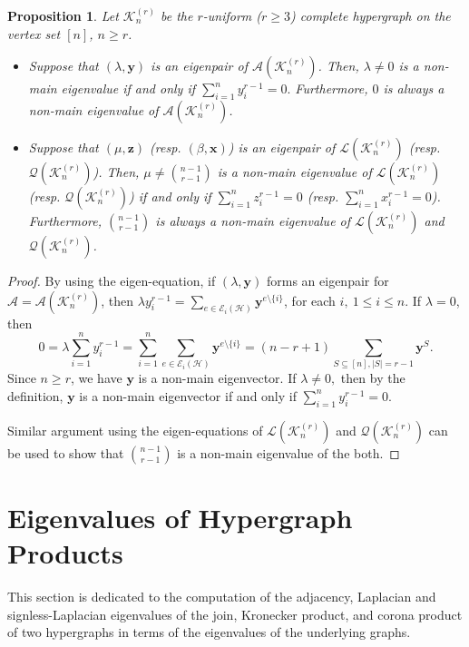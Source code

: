 \documentclass[10pt,a4paper]{article}
\newtheorem{proposition}{Proposition}[section]
\begin{document}
	\begin{proposition}
		Let $\mathcal{K}_n^{(r)}$ be the $r$-uniform ($r \geq 3$) complete hypergraph on the vertex set $[n]$, $n \geq r$.
		\begin{itemize}
			\item Suppose that  $(\lambda, \mathbf{y})$ is an eigenpair of $\mathcal{A}(\mathcal{K}_n^{(r)})$. Then, $\lambda \neq 0$ is a non-main eigenvalue if and only if $\sum_{i=1}^n y_i^{r-1}=0.$ 
			Furthermore,      $0$ is always a non-main eigenvalue of $\mathcal{A}(\mathcal{K}_n^{(r)})$.
			\item Suppose that  $(\mu, \mathbf{z})$ (resp. $(\beta, \mathbf{x})$) is an eigenpair of $\mathcal{L}(\mathcal{K}_n^{(r)})$ (resp. $\mathcal{Q}(\mathcal{K}_n^{(r)})$). Then, $\mu \neq \binom{n-1}{r-1}$ is a non-main eigenvalue of $\mathcal{L}(\mathcal{K}_n^{(r)})$ (resp. $\mathcal{Q}(\mathcal{K}_n^{(r)})$) if and only if $\sum_{i=1}^n z_i^{r-1}=0$ (resp. $\sum_{i=1}^n x_i^{r-1}=0$). 
			Furthermore, $\binom{n-1}{r-1}$ is always a non-main eigenvalue of $\mathcal{L}(\mathcal{K}_n^{(r)})$ and $\mathcal{Q}(\mathcal{K}_n^{(r)})$. 
		\end{itemize}
	\end{proposition}
	\begin{proof}
		By using the eigen-equation, if $(\lambda, \mathbf{y})$ forms an eigenpair for $\mathcal{A}=\mathcal{A}(\mathcal{K}_n^{(r)})$, then $\lambda y_i^{r-1} = \sum_{e \in \mathcal{E}_i(\mathcal{H})} \mathbf{y}^{e \setminus \{i\}}$, for each $i, ~1 \leq i \leq n$. 
		If $\lambda=0$, then $$0= \lambda \sum\limits_{i=1}^n y_i^{r-1} = \sum_{i=1}^n \sum_{e \in \mathcal{E}_i(\mathcal{H})} \mathbf{y}^{e \setminus \{i\}} = (n-r+1)\sum\limits_{S \subseteq [n], |S|=r-1} \mathbf{y}^S.$$ Since $n \geq r$, we have $\mathbf{y}$ is a non-main eigenvector.
		If $\lambda \neq 0,$ then by the definition, $\mathbf{y}$ is a  non-main eigenvector if and only if $\sum_{i=1}^n y_i^{r-1}=0.$ 
		
		Similar argument using the eigen-equations of $\mathcal{L}(\mathcal{K}_n^{(r)})$ and $\mathcal{Q}(\mathcal{K}_n^{(r)})$ can be used to show that $\binom{n-1}{r-1}$ is a non-main eigenvalue of the both.
	\end{proof}
	
	
	\section{Eigenvalues of Hypergraph Products}\label{sec_3}
	
	This section is dedicated to the computation of the adjacency, Laplacian and signless-Laplacian eigenvalues of the join, Kronecker product, and corona product of two hypergraphs in terms of the eigenvalues of the underlying graphs.
	
\end{document}
